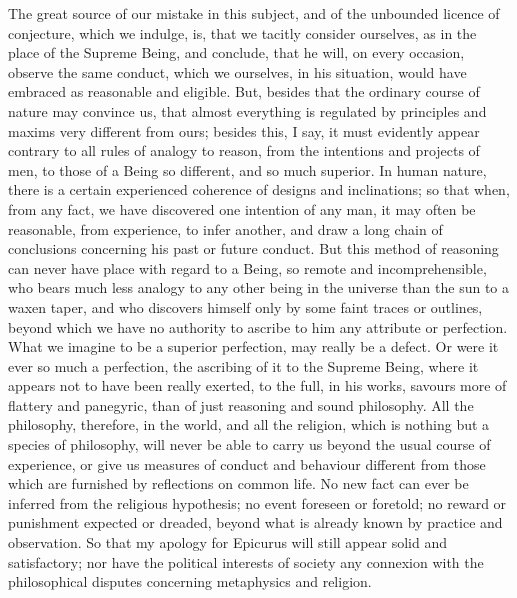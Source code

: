 \documentclass[]{article}
\begin{document}
\begin{sectionbody}
\humeparagraph  The great source of our mistake in this subject, and of the unbounded licence of conjecture, which we indulge, is, that we tacitly consider ourselves, as in the place of the Supreme Being, and conclude, that he will, on every occasion, observe the same conduct, which we ourselves, in his situation, would have embraced as reasonable and eligible. But, besides that the ordinary course of nature may convince us, that almost everything is regulated by principles and maxims very different from ours; besides this, I say, it must evidently appear contrary to all rules of analogy to reason, from the intentions and projects of men, to those of a Being so different, and so much superior. In human nature, there is a certain experienced coherence of designs and inclinations; so that when, from any fact, we have discovered one intention of any man, it may often be reasonable, from experience, to infer another, and draw a long chain of conclusions concerning his past or future conduct. But this method of reasoning can never have place with regard to a Being, so remote and incomprehensible, who bears much less analogy to any other being in the universe than the sun to a waxen taper, and who discovers himself only by some faint traces or outlines, beyond which we have no authority to ascribe to him any attribute or perfection. What we imagine to be a superior perfection, may really be a defect. Or were it ever so much a perfection, the ascribing of it to the Supreme Being, where it appears not to have been really exerted, to the full, in his works, savours more of flattery and panegyric, than of just reasoning and sound philosophy. All the philosophy, therefore, in the world, and all the religion, which is nothing but a species of philosophy, will never be able to carry us beyond the usual course of experience, or give us measures of conduct and behaviour different from those which are furnished by reflections on common life. No new fact can ever be inferred from the religious hypothesis; no event foreseen or foretold; no reward or punishment expected or dreaded, beyond what is already known by practice and observation. So that my apology for Epicurus will still appear solid and satisfactory; nor have the political interests of society any connexion with the philosophical disputes concerning metaphysics and religion.


\end{sectionbody}
\end{document}
